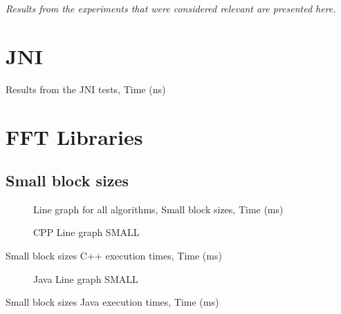 \textit{Results from the experiments that were considered relevant are presented here.}

\section{JNI}

\begin{table}
    \centering
    \label{tab:jni:common}
    \caption{Results from the JNI tests, Time (ns)}
    
\end{table}


\section{FFT Libraries}

\subsection{Small block sizes}

\begin{figure}
    \centering
    \caption{Line graph for all algorithms, Small block sizes, Time (ms)}
    \label{fig:all:line:small}
    
\end{figure}

\begin{figure}
    \centering
    \label{fig:cpp:line:small}
    \caption{CPP Line graph SMALL}
    
\end{figure}
\begin{table}
    \centering
    \label{tab:cpp:small}
    \caption{Small block sizes C++ execution times, Time (ms)}
    \resizebox{\columnwidth}{!}{
        
    }
\end{table}


\begin{figure}
    \centering
    \label{fig:java:line:small}
    \caption{Java Line graph SMALL}
    
\end{figure}
\begin{table}
    \centering
    \label{tab:java:small}
    \caption{Small block sizes Java execution times, Time (ms)}
    \resizebox{\columnwidth}{!}{
        
    }
\end{table}


